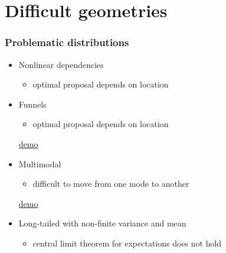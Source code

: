 \documentclass[10pt]{beamer}
\begin{document}
\section{Difficult geometries}
\frame{\sectionpage}

\begin{frame}

\frametitle{Problematic distributions}

  \begin{itemize}
  \item<1-> Nonlinear dependencies
    \begin{itemize}
    \item optimal proposal depends on location
    \end{itemize}
  \item<2-> Funnels
    \begin{itemize}
    \item optimal proposal depends on location
    \end{itemize}
    \begin{center}
      \href{https://chi-feng.github.io/mcmc-demo/app.html?algorithm=RandomWalkMH&target=funnel}{demo}
    \end{center}
  \item<3-> Multimodal
    \begin{itemize}
    \item difficult to move from one mode to another
    \end{itemize}
        \begin{center}
      \href{https://chi-feng.github.io/mcmc-demo/app.html?algorithm=RandomWalkMH&target=multimodal}{demo}
    \end{center}
  \item<4-> Long-tailed with non-finite variance and mean
    \begin{itemize}
    \item central limit theorem for expectations does not hold
    \end{itemize}

  \end{itemize}

\end{frame}

\end{document}
